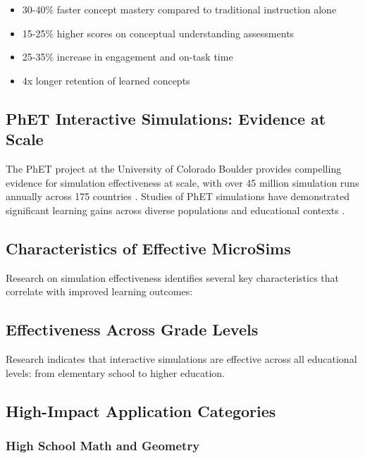 \begin{itemize}
\item 30-40\% faster concept mastery compared to traditional instruction alone
\item 15-25\% higher scores on conceptual understanding assessments
\item 25-35\% increase in engagement and on-task time
\item 4x longer retention of learned concepts
\end{itemize}

\subsection{PhET Interactive Simulations: Evidence at Scale}

The PhET project at the University of Colorado Boulder provides compelling evidence for simulation effectiveness at scale, with over 45 million simulation runs annually across 175 countries \cite{phet2023}. Studies of PhET simulations have demonstrated significant learning gains across diverse populations and educational contexts \cite{adams2008study, finkelstein2005phet, perkins2006phet}.

\subsection{Characteristics of Effective MicroSims}

Research on simulation effectiveness identifies several key characteristics that correlate with improved learning outcomes:

\subsection{Effectiveness Across Grade Levels}
Research indicates that interactive simulations are effective across all educational levels: from elementary school to higher education.

\subsection{High-Impact Application Categories}

\subsubsection{High School Math and Geometry}

